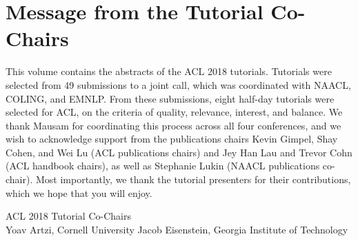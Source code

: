 \section{Message from the Tutorial Co-Chairs}\vspace{2em}
\thispagestyle{emptyheader}

\setlength{\parskip}{.7ex}

This volume contains the abstracts of the ACL 2018 tutorials. Tutorials 
were selected from 49 submissions to a joint call, which was coordinated 
with NAACL, COLING, and EMNLP. From these submissions, eight half-day 
tutorials were selected for ACL, on the criteria of quality, relevance, 
interest, and balance. We thank Mausam for coordinating this process 
across all four conferences, and we wish to acknowledge support from the 
publications chairs Kevin Gimpel, Shay Cohen, and Wei Lu (ACL 
publications chairs) and Jey Han Lau and Trevor Cohn (ACL handbook 
chairs), as well as Stephanie Lukin (NAACL publications co-chair). Most 
importantly, we thank the tutorial presenters for their contributions, 
which we hope that you will enjoy.



\vspace{1.0em}
\noindent ACL 2018 Tutorial Co-Chairs \\
Yoav Artzi, Cornell University
Jacob Eisenstein, Georgia Institute of Technology
